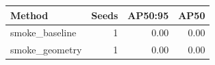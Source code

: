 \begin{tabular}{lrrr}
\hline
Method & Seeds & AP50:95 & AP50 \\
\hline
smoke\_baseline & 1 & 0.00 & 0.00 \\
smoke\_geometry & 1 & 0.00 & 0.00 \\
\hline
\end{tabular}
